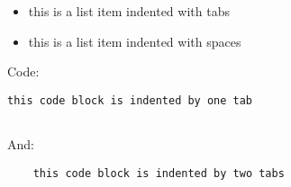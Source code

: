 \begin{itemize}
\item this is a list item
indented with tabs


\item this is a list item
indented with spaces



\end{itemize}
Code:


\begin{verbatim}
this code block is indented by one tab


\end{verbatim}
And:


\begin{verbatim}
    this code block is indented by two tabs
\end{verbatim}
